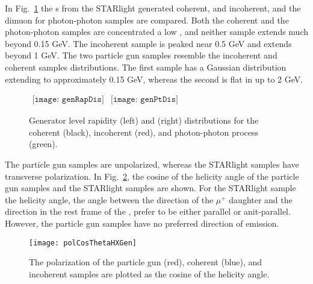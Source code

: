 {    In Fig.~\ref{fig:starlightRapPtDist} the \DIFdelbegin %
\DIFdelend \JPsi{}s \DIFaddbegin \pt{} \DIFaddend from the 
      STARlight generated coherent, and incoherent, and the dimuon \DIFdelbegin %
\DIFdelend \DIFaddbegin \pt{} \DIFaddend for 
      photon-photon samples are compared.
    Both the coherent and the photon-photon samples are concentrated a low 
      \pt{}, and neither sample extends much beyond 0.15 GeV.
    The incoherent sample is peaked near 0.5 GeV and extends beyond 1 GeV.
    The two particle gun samples resemble the incoherent and coherent samples
      \pt{} distributions.
    The first sample has a Gaussian \pt{} distribution extending to 
      approximately 0.15 GeV, whereas the second is flat in \pt{} up to
      2 GeV.
    \begin{figure}[!Hhbt]
      \centering
      $ \begin{array}{cc}
        \texttt{[image: genRapDis]} &
        \texttt{[image: genPtDis]}
      \end{array} $
      \caption{Generator level rapidity (left) and \pt{} (right) 
          distributions for the coherent (black), incoherent (red), 
          and photon-photon process (green).}
      \label{fig:starlightRapPtDist}
    \end{figure}

    The particle gun samples are unpolarized, whereas the STARlight samples 
      have transverse polarization.
    In Fig.~\ref{fig:genHXAngle}, the cosine of the helicity angle of the 
      particle gun samples and the STARlight samples are shown.
    For the STARlight sample the helicity angle, the angle between the 
      direction of the $\mu^{+}$ daughter and the \JPsi{} direction in the rest
      frame of the \JPsi{}, prefer to be either parallel or anit-parallel.
    However, the particle gun samples have no preferred direction of emission.
    \DIFdelbegin %

\DIFdelend \begin{figure}[!Hhbt]
      \centering
      \texttt{[image: polCosThetaHXGen]}
      \caption{ The \JPsi{} polarization of the particle gun (red),
        coherent (blue), and incoherent samples are plotted as the
        cosine of the helicity angle.} 
      \label{fig:genHXAngle}
    \end{figure}

}
